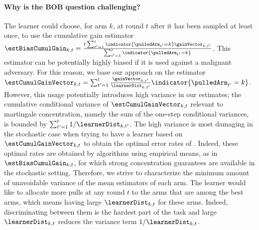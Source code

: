 \paragraph{Why is the BOB question challenging?}
The learner could choose, 
for arm $k$, at round $t$ after it has been sampled at least once, to use the 
cumulative gain  estimator  $\estBiasCumulGain_{k,t} = 
\frac{t\sum_{t'=1}^{t}\indicator{\pulledArm_{t'}=k}\gainVector_{k,t'}}{\sum_{t'=1}^{t}\indicator{\pulledArm_{t'}=k}} 
$.
This estimator can be potentially highly biased if it is used against a 
malignant adversary. For this reason, we base our approach on 
the estimator $\estCumulGainVector_{k,t} = \sum_{t'=1}^{t}
\frac{\gainVector_{k,t'}}{\learnerDist_{k,t'}}\indicator{\pulledArm_{t'} = k}$.
However, this usage potentially introduces high variance in our estimates;
the cumulative conditional variance of $\estCumulGainVector_{k,t}$
relevant to martingale concentration, namely the sum of the one-step
conditional variances, is bounded by $\sum_{t'=1}^{t} 1/ \learnerDist_{k,t'}$.
The high variance is most damaging in the stochastic case when trying 
to have a learner based on $\estCumulGainVector_{k,t}$ to obtain the 
optimal error rates of \cite{Karnin13AO}. Indeed, these 
optimal rates are obtained by algorithms using empirical means, as in
$\estBiasCumulGain_{k,t}$, for which strong concentration guarantees
are available in the stochastic setting.
Therefore,  
we strive to characterize the minimum amount of 
unavoidable variance of the mean estimators of each arm.
The learner would like to allocate more pulls at any round $t$ 
to the arms that are among the best arms, which means having large 
$\learnerDist_{k,t}$ for these arms. Indeed,  discriminating 
between them is the hardest part of the task and large 
$\learnerDist_{k,t}$ reduces the variance term $1/\learnerDist_{k,t}$. 
